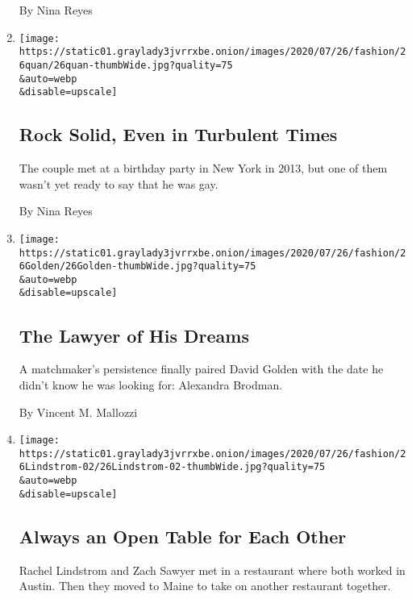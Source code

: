 \begin{enumerate}
  By Nina Reyes
\item
  \href{/2020/07/24/fashion/weddings/rock-solid-even-in-turbulent-times.html}{}

  \texttt{[image: https://static01.graylady3jvrrxbe.onion/images/2020/07/26/fashion/26quan/26quan-thumbWide.jpg?quality=75\\\&auto=webp\\\&disable=upscale]}

  \hypertarget{rock-solid-even-in-turbulent-times}{%
  \subsection{Rock Solid, Even in Turbulent
  Times}\label{rock-solid-even-in-turbulent-times}}

  The couple met at a birthday party in New York in 2013, but one of
  them wasn't yet ready to say that he was gay.

  By Nina Reyes
\item
  \href{/2020/07/24/fashion/weddings/the-lawyer-of-his-dreams.html}{}

  \texttt{[image: https://static01.graylady3jvrrxbe.onion/images/2020/07/26/fashion/26Golden/26Golden-thumbWide.jpg?quality=75\\\&auto=webp\\\&disable=upscale]}

  \hypertarget{the-lawyer-of-his-dreams}{%
  \subsection{The Lawyer of His Dreams}\label{the-lawyer-of-his-dreams}}

  A matchmaker's persistence finally paired David Golden with the date
  he didn't know he was looking for: Alexandra Brodman.

  By Vincent M. Mallozzi
\item
  \href{/2020/07/24/fashion/weddings/always-an-open-table-for-each-other.html}{}

  \texttt{[image: https://static01.graylady3jvrrxbe.onion/images/2020/07/26/fashion/26Lindstrom-02/26Lindstrom-02-thumbWide.jpg?quality=75\\\&auto=webp\\\&disable=upscale]}

  \hypertarget{always-an-open-table-for-each-other}{%
  \subsection{Always an Open Table for Each
  Other}\label{always-an-open-table-for-each-other}}

  Rachel Lindstrom and Zach Sawyer met in a restaurant where both worked
  in Austin. Then they moved to Maine to take on another restaurant
  together.


\end{enumerate}
